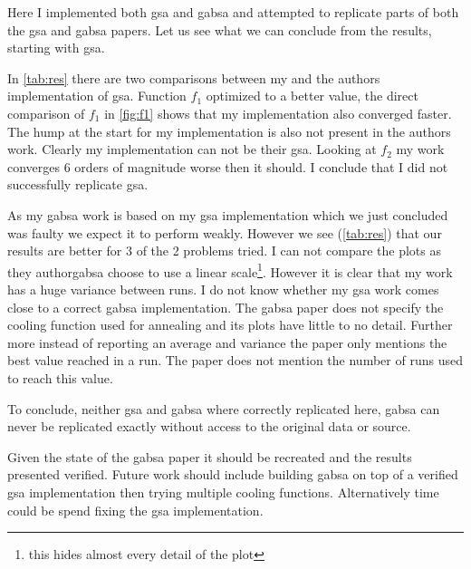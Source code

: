 Here I implemented both \ac{gsa} and \ac{gabsa} and attempted to replicate parts of both the \ac{gsa}\cite{GSA} and \ac{gabsa}\cite{GABSA} papers. Let us see what we can conclude from the results, starting with \ac{gsa}.

In \cref{tab:res} there are two comparisons between my and the authors implementation of \ac{gsa}. Function $f_1$ optimized to a better value, the direct comparison of $f_1$ in \cref{fig:f1} shows that my implementation also converged faster. The hump at the start for my implementation is also not present in the authors work. Clearly my implementation can not be their \ac{gsa}. Looking at $f_2$ my work converges 6 orders of magnitude worse then it should. I conclude that I did not successfully replicate \ac{gsa}.

As my \ac{gabsa} work is based on my \ac{gsa} implementation which we just concluded was faulty we expect it to perform weakly. However we see (\cref{tab:res}) that our results are better for 3 of the 2 problems tried. I can not compare the plots as they author\ac{gabsa} choose to use a linear scale\footnote{this hides almost every detail of the plot}. However it is clear that my work has a huge variance between runs. I do not know whether my \ac{gsa} work comes close to a correct \ac{gabsa} implementation.
%
The \ac{gabsa} paper\cite{GABSA} does not specify the cooling function used for annealing and its plots have little to no detail. Further more instead of reporting an average and variance the paper only mentions the best value reached in a run. The paper does not mention the number of runs used to reach this value.

To conclude, neither \ac{gsa} and \ac{gabsa} where correctly replicated here, \ac{gabsa} can never be replicated exactly without access to the original data or source.

Given the state of the \ac{gabsa} paper\cite{GABSA} it should be recreated and the results presented verified. Future work should include building \ac{gabsa} on top of a verified \ac{gsa} implementation then trying multiple cooling functions. Alternatively time could be spend fixing the \ac{gsa} implementation.
